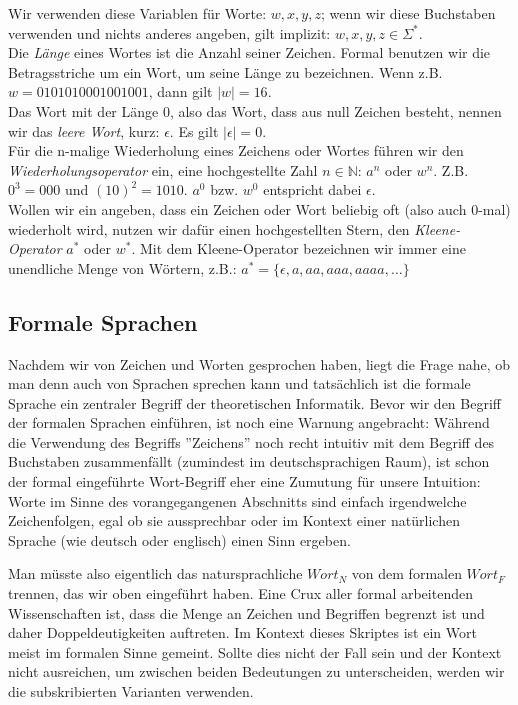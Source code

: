 {\noindent
Wir verwenden diese Variablen für Worte:
$w, x, y, z$; wenn wir diese Buchstaben verwenden und nichts anderes angeben,
gilt implizit: $w, x, y, z \in \Sigma^*$.\\

\noindent
Die \emph{Länge} eines Wortes ist die Anzahl seiner Zeichen.
Formal benutzen wir die Betragsstriche um ein Wort, um seine
Länge zu bezeichnen. Wenn z.B. $w = 0101010001001001$, dann gilt $|w| = 16$.\\

\noindent
Das Wort mit der Länge 0, also das Wort, dass aus null Zeichen besteht,
nennen wir das \emph{leere Wort}, kurz: $\epsilon$.
Es gilt $|\epsilon| = 0$.\\

\noindent
Für die n-malige Wiederholung eines Zeichens oder Wortes führen wir den \emph{Wiederholungsoperator}
ein, eine hochgestellte Zahl $n \in \mathbb{N}$: $a^n$ oder $w^n$.
Z.B. $0^3 = 000$ und $(10)^2 = 1010$.
$a^0$ bzw. $w^0$ entspricht dabei $\epsilon$.\\

\noindent
Wollen wir ein angeben, dass ein Zeichen oder Wort beliebig oft (also auch 0-mal) wiederholt
wird, nutzen wir dafür einen hochgestellten Stern, den \emph{Kleene-Operator} $a^*$ oder $w^*$.
Mit dem Kleene-Operator bezeichnen wir immer eine unendliche Menge von Wörtern, z.B.:
$a^* = \{\epsilon, a, aa, aaa, aaaa, \dots\}$

\subsection{Formale Sprachen}

Nachdem wir von Zeichen und Worten gesprochen haben, liegt die Frage nahe,
ob man denn auch von Sprachen sprechen kann und tatsächlich ist die formale Sprache 
ein zentraler Begriff der theoretischen Informatik.
Bevor wir den Begriff der formalen Sprachen einführen, ist noch eine Warnung angebracht:
Während die Verwendung des Begriffs ''Zeichens''
noch recht intuitiv mit dem Begriff des Buchstaben zusammenfällt
(zumindest im deutschsprachigen Raum),
ist schon der formal eingeführte Wort-Begriff eher eine Zumutung für unsere Intuition:
Worte im Sinne des vorangegangenen Abschnitts sind einfach irgendwelche Zeichenfolgen,
egal ob sie aussprechbar oder im Kontext einer natürlichen Sprache
(wie deutsch oder englisch) einen Sinn ergeben.

Man müsste also eigentlich das natursprachliche $Wort_N$ von dem formalen $Wort_F$ trennen,
das wir oben eingeführt haben.
Eine Crux aller formal arbeitenden Wissenschaften ist,
dass die Menge an Zeichen und Begriffen begrenzt ist und daher Doppeldeutigkeiten auftreten.
Im Kontext dieses Skriptes ist ein Wort meist im formalen Sinne gemeint.
Sollte dies nicht der Fall sein und der Kontext nicht ausreichen,
um zwischen beiden Bedeutungen zu unterscheiden,
werden wir die subskribierten Varianten verwenden.

}
